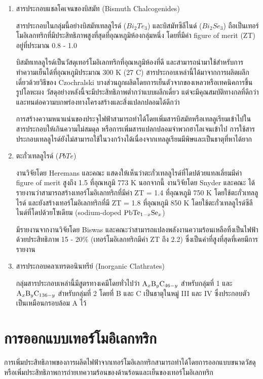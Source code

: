 \documentclass[a4paper,nobib,openany,10pt]{tufte-book}
\begin{document}
\begin{enumerate}
\item สารประกอบแชลโคเจนของบิสมัท (Bismuth Chalcogenides)

สารประกอบในกลุ่มนี้อย่างบิสมัทเทลลูไรด์ (\(Bi_2Te_3\))
และบิสมัทซีลีไนด์ (\(Bi_2Se_3\))
ถือเป็นเทอร์โมอิเลกทริกที่มีประสิทธิภาพสูงที่สุดที่อุณหภูมิห้องกลุ่มหนึ่ง
โดยที่มีค่า figure of merit (ZT) อยู่ที่ประมาณ 0.8 - 1.0

บิสมัทเทลลูไรด์เป็นวัสดุเทอร์โมอิเลกทริกที่อุณหภูมิห้องที่ดี
และสามารถนำมาใช้สำหรับการทำความเย็นได้ที่อุณหภูมิประมาณ 300 K (27 C)
สารประกอบเหล่านี้ได้มาจากการผลิตผลึกเดี่ยวด้วยวิธีของ Czochralski
บางส่วนถูกผลิตโดยการเย็นตัวจากของเหลวหรือเทคนิคการขึ้นรูปโลหะผง
วัสดุอย่างหลังนี้จะมีประสิทธิภาพต่ำกว่าแบบผลึกเดี่ยว
แต่จะมีคุณสมบัติทางกลที่ดีกว่าและทนต่อความบกพร่องทางโครงสร้างและสิ่งแปลกปลอมได้ดีกว่า

การสร้างความหนาแน่นของประจุไฟฟ้าสามารถทำได้โดยเพิ่มสารบิสมัทหรือเทลลูเรียมเข้าไปในสารประกอบให้เกินความไม่สมดุล
หรือการเพิ่มสารแปลกปลอมจำพวกฮาโลเจนเข้าไป
การใช้สารประกอบเทลลูไรด์ยังไม่สามารถใช้ในวงกว้างได้เนื่องจากเทลลูเรียมมีพิษและเป็นธาตุที่หาได้ยาก

\item ตะกั่วเทลลูไรด์ (\(PbTe\))

งานวิจัยโดย Heremans และคณะ
แสดงให้เห็นว่าตะกั่วเทลลูไรด์ที่โดปด้วยแทลเลี่ยมมีค่า figure of merit
สูงถึง 1.5 ที่อุณหภูมิ 773 K นอกจากนี้ งานวิจัยโดย Snyder และคณะ
ได้รายงานว่าสามารถสร้างเทอร์โมอิเลกทริกที่มีค่า ZT = 1.4 ที่อุณหภูมิ
750 K โดยใช้ตะกั่วเทลลูไรด์ และยังสร้างเทอร์โมอิเลกทริกที่มี ZT = 1.8
ที่อุณหภูมิ 850 K โดยใช้ตะกั่วเทลลูไรด์ซีลีไนด์ที่โดปด้วยโซเดียม
(sodium-doped \(\ce{PbTe_{1-x}Se_x}\))

มีรายงานจากงานวิจัยโดย Biswas
และคณะว่าสามารถแปลงพลังงานความร้อนเหลือทิ้งเป็นไฟฟ้าด้วยประสิทธิภาพ
15 - 20\% (เทอร์โมอิเลกทริกมีค่า ZT ถึง 2.2)
ซึ่งเป็นค่าที่สูงที่สุดที่เคยมีการรายงาน

\item สารประกอบคลาเทรตอนินทรีย์ (Inorganic Clathrates)

กลุ่มสารประกอบเหล่านี้มีสูตรทางเคมีโดยทั่วไปว่า \(\ce{A_xB_yC_{46-y}}\)
สำหรับกลุ่มที่ 1 และ \(\ce{A_xB_yC_{136-y}}\) สำหรับกลุ่มที่ 2 โดยที่ B
และ C เป็นธาตุในหมู่ III และ IV ซึ่งประกอบตัวเป็นเหมือนกรอบล้อม A ไว้
\end{enumerate}

\section{การออกแบบเทอร์โมอิเลกทริก}
\label{sec:org5d4e679}
การเพิ่มประสิทธิภาพของการผลิตไฟฟ้าจากเทอร์โมอิเลกทริกสามารถทำได้โดยการออกแบบขนาดวัสดุหรือเพิ่มประสิทธิภาพการถ่ายเทความร้อนของด้านร้อนและเย็นของเทอร์โมอิเลกทริก
\end{document}
